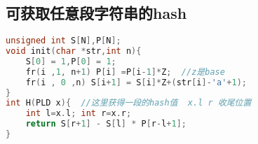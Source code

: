 \subsection{可获取任意段字符串的hash}
		\begin{lstlisting}[language=c++]
unsigned int S[N],P[N];
void init(char *str,int n){
	S[0] = 1,P[0] = 1;
	fr(i ,1, n+1) P[i] =P[i-1]*Z;  //z是base
	fr(i , 0 ,n) S[i+1] = S[i]*Z+(str[i]-'a'+1);
}
int H(PLD x){  //这里获得一段的hash值  x.l r 收尾位置
	int l=x.l; int r=x.r;
	return S[r+1] - S[l] * P[r-l+1];  
}
		\end{lstlisting}